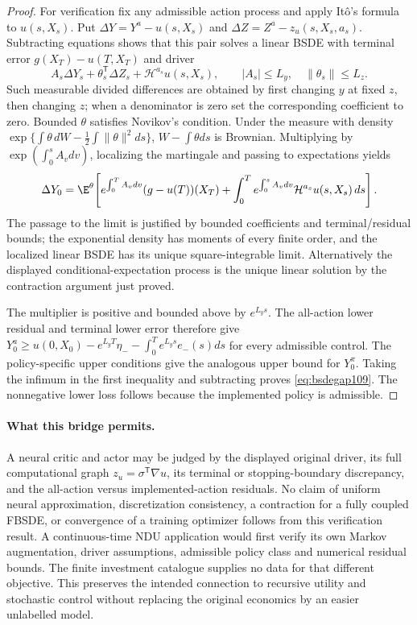 \begin{proof}
For verification fix any admissible action process and apply It\^o's formula to $u(s,X_s)$. Put $\Delta Y=Y^a-u(s,X_s)$ and $\Delta Z=Z^a-z_u(s,X_s,a_s)$. Subtracting equations shows that this pair solves a linear BSDE with terminal error $g(X_T)-u(T,X_T)$ and driver
\[
 A_s\Delta Y_s+\theta_s^{\mathsf T}\Delta Z_s+\mathcal H^{a_s}u(s,X_s),
 \qquad |A_s|\le L_y,\quad\|\theta_s\|\le L_z.
\]
Such measurable divided differences are obtained by first changing $y$ at fixed $z$, then changing $z$; when a denominator is zero set the corresponding coefficient to zero. Bounded $\theta$ satisfies Novikov's condition. Under the measure with density
$\exp\{\int\theta\,dW-\tfrac12\int\|\theta\|^2ds\}$,
$W-\int\theta ds$ is Brownian. Multiplying by $\exp(\int_0^s A_vdv)$, localizing the martingale and passing to expectations yields
\[
 \Delta Y_0=\E^{\theta}\!\left[
 e^{\int_0^TA_vdv}(g-u(T))(X_T)
 +\int_0^T e^{\int_0^sA_vdv}\mathcal H^{a_s}u(s,X_s)\,ds\right].
\]
The passage to the limit is justified by bounded coefficients and terminal/residual bounds; the exponential density has moments of every finite order, and the localized linear BSDE has its unique square-integrable limit. Alternatively the displayed conditional-expectation process is the unique linear solution by the contraction argument just proved.

The multiplier is positive and bounded above by $e^{L_ys}$. The all-action lower residual and terminal lower error therefore give
$Y_0^a\ge u(0,X_0)-e^{L_yT}\eta_- -\int_0^Te^{L_ys}e_-(s)ds$
for every admissible control. The policy-specific upper conditions give the analogous upper bound for $Y_0^\pi$. Taking the infimum in the first inequality and subtracting proves \eqref{eq:bsdegap109}. The nonnegative lower loss follows because the implemented policy is admissible.
\end{proof}

\paragraph{What this bridge permits.}
A neural critic and actor may be judged by the displayed original driver, its full computational graph $z_u=\sigma^{\mathsf T}\nabla u$, its terminal or stopping-boundary discrepancy, and the all-action versus implemented-action residuals. No claim of uniform neural approximation, discretization consistency, a contraction for a fully coupled FBSDE, or convergence of a training optimizer follows from this verification result. A continuous-time NDU application would first verify its own Markov augmentation, driver assumptions, admissible policy class and numerical residual bounds. The finite investment catalogue supplies no data for that different objective. This preserves the intended connection to recursive utility and stochastic control without replacing the original economics by an easier unlabelled model.
